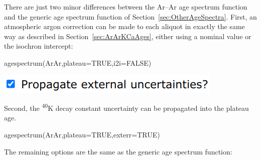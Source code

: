 \begin{refsection}
There are just two minor differences between the Ar--Ar age spectrum
function and the generic age spectrum function of
Section~\ref{sec:OtherAgeSpectra}. First, an atmospheric argon
correction can be made to each aliquot in exactly the same way as
described in Section~\ref{sec:ArArKCaAges}, either using a nominal
value or the isochron intercept:

\begin{console}
agespectrum(ArAr,plateau=TRUE,i2i=FALSE)
\end{console}

\noindent\begin{minipage}[t]{.35\linewidth}
\strut\vspace*{-\baselineskip}\newline
\includegraphics[width=\linewidth]{../figures/ArArExterr.png}
\end{minipage}
\begin{minipage}[t]{.65\linewidth}
Second, the \textsuperscript{40}K decay constant uncertainty can be
propagated into the plateau age.
\end{minipage}

\begin{console}
agespectrum(ArAr,plateau=TRUE,exterr=TRUE)
\end{console}

The remaining options are the same as the generic age spectrum
function:\\


\end{refsection}
